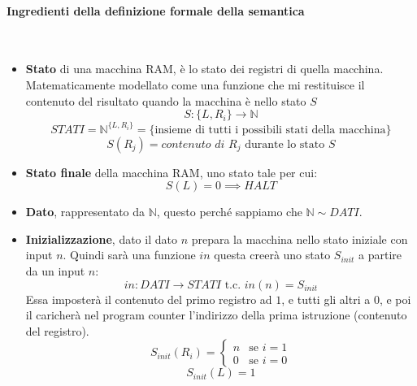 \documentclass{article}
\begin{document}
\paragraph{Ingredienti della definizione formale della semantica}\mbox{}\\
\begin{itemize}
    \item \textbf{Stato} di una macchina RAM, è lo stato dei registri di quella macchina.
          Matematicamente modellato come una funzione che mi restituisce il contenuto
          del risultato quando la macchina è nello stato $S$
          $$S:\{L, R_i\}\rightarrow\mathbb{N}$$
          $$STATI=\mathbb{N}^{\{L,R_i\}}=\{\text{insieme di tutti i possibili stati della macchina}\}$$
          $$S(R_j) = \textit{contenuto di } R_j\text{ durante lo stato } S$$

    \item \textbf{Stato finale} della macchina RAM, uno stato tale per cui:$$S(L)=0\implies HALT$$
    \item \textbf{Dato}, rappresentato da $\mathbb{N}$, questo perché sappiamo che $\mathbb{N}\sim DATI$.
    \item \textbf{Inizializzazione}, dato il dato $n$ prepara la macchina nello stato iniziale
          con input $n$. Quindi sarà una funzione $in$ questa creerà uno stato $S_{init}$ a partire
          da un input $n$:
          $$in:DATI\rightarrow STATI \text{ t.c. } in(n)=S_{init}$$
          Essa imposterà il contenuto del primo registro ad $1$, e tutti gli altri a $0$, e poi
          il caricherà nel program counter l'indirizzo della prima istruzione (contenuto
          del registro).
          \[
              S_{init}(R_i)=
              \begin{cases}
                  n & \text{se } i=1 \\
                  0 & \text{se } i=0
              \end{cases}
          \]
          $$S_{init}(L)=1$$


\end{itemize}
\end{document}
